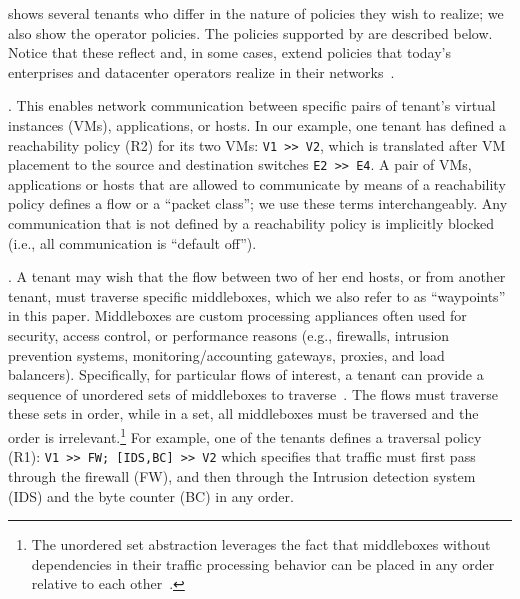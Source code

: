  
  shows several tenants who
 differ in the nature of policies they wish to realize; we also show
 the operator policies. The policies  supported by \Name are described
 below. Notice that these reflect and, in some cases, extend policies
 that today's enterprises and datacenter operators
 realize in their networks~\cite{mpa-imc15}.





. This enables network communication
  between specific pairs of tenant's virtual instances (VMs),
  applications, or hosts.  In our example, one tenant has defined a
  reachability policy (R2) for its two VMs: \texttt{V1 >> V2}, which
  is translated after VM placement  
  to the source and destination switches
   \texttt{E2 >> E4}. A pair of VMs, applications or hosts
  that are allowed to communicate by means of a reachability policy
  defines a flow or a ``packet class''; we use these terms
  interchangeably. Any communication that is not defined by a
  reachability policy is implicitly blocked (i.e., all communication
  is ``default off'').
  
. A tenant may wish that the flow
  between two of her end hosts, or from another tenant, must traverse
  specific middleboxes, which we also refer to as ``waypoints'' in
  this paper. Middleboxes are custom processing appliances often used
  for security, access control, or performance reasons (e.g.,
  firewalls, intrusion prevention systems, monitoring/accounting
  gateways, proxies, and load balancers). Specifically, for particular
  flows of interest, a tenant can provide a sequence of unordered sets
  of middleboxes
  to traverse~\cite{pga}. The flows must traverse these sets in order,
  while in a set, all middleboxes must be traversed and the order is
  irrelevant.\footnote{The unordered set abstraction leverages the
    fact that middleboxes without dependencies in their traffic
    processing behavior can be placed in any order relative to each
    other~\cite{pga}.} For example, one of the tenants defines a
  traversal policy (R1): \texttt{V1 >> FW; [IDS,BC] >> V2} which specifies
  that traffic must first pass through the firewall (FW), and then
  through the Intrusion detection system (IDS) and the byte counter
  (BC) in any order.

